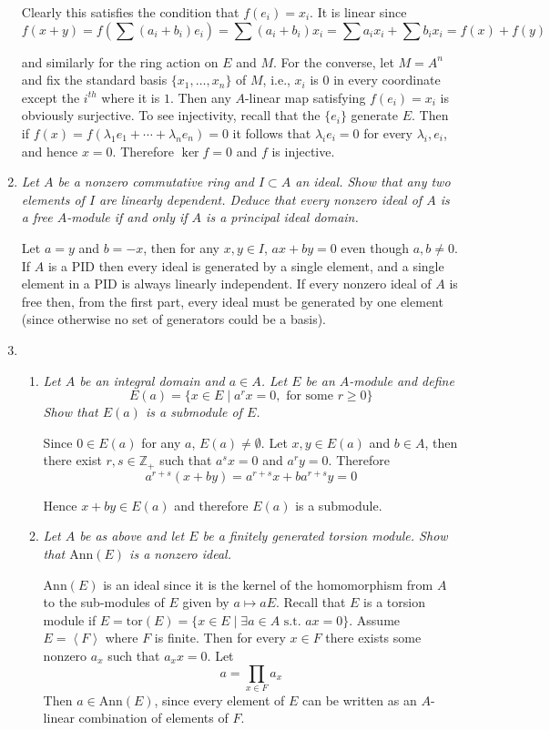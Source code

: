 \documentclass[10pt]{article}
\newcommand{\brac}[1]{
\left\langle #1 \right\rangle
}
\newcommand{\Ann}{\text{Ann}}
\newcommand{\tor}{\text{tor}}
\newcommand{\Z}{\mathbb{Z}}
\begin{document}
\begin{enumerate}
Clearly this satisfies the condition that $f(e_i) = x_i$.  It is linear since
\[
f(x+y) = f\left(\sum (a_i+b_i) e_i \right) = \sum (a_i +b_i) x_i = \sum a_i x_i  + \sum b_i x_i = f(x) + f(y)
\]

and similarly for the ring action on $E$ and $M$.  For the converse, let $M = A^n$ and fix the standard basis $\{x_1, \ldots, x_n\}$ of $M$, i.e., $x_i$ is $0$ in every coordinate except the $i^{th}$ where it is $1$.  Then any $A$-linear map satisfying $f(e_i) = x_i$ is obviously surjective.  To see injectivity, recall that the $\{e_i\}$ generate $E$.  Then if $f(x) = f(\lambda_1e_1 + \cdots + \lambda_ne_n) = 0$ it follows that $\lambda_ie_i = 0$ for every $\lambda_i, e_i$, and hence $x=0$.  Therefore $\ker f = 0$ and $f$ is injective.

\item \emph{Let $A$ be a nonzero commutative ring and $I \subset A$ an ideal.  Show that any two elements of $I$ are linearly dependent.  Deduce that every nonzero ideal of $A$ is a free $A$-module if and only if $A$ is a principal ideal domain.}

Let $a = y$ and $b = -x$, then for any $x,y \in I$, $ax + by = 0$ even though $a,b \neq 0$.  If $A$ is a PID then every ideal is generated by a single element, and a single element in a PID is always linearly independent.  If every nonzero ideal of $A$ is free then, from the first part, every ideal must be generated by one element (since otherwise no set of generators could be a basis).

\item
\begin{enumerate}
\item \emph{Let $A$ be an integral domain and $a \in A$.  Let $E$ be an $A$-module and define $$E(a) = \{x \in E \mid a^rx = 0, \mbox{ for some $r \geq 0$}\}$$  Show that $E(a)$ is a submodule of $E$.}

Since $0 \in E(a)$ for any $a$, $E(a) \neq \emptyset$.  Let $x,y \in E(a)$ and $b \in A$, then there exist $r,s \in \Z_+$ such that $a^sx = 0$ and $a^ry = 0$.  Therefore
\[
a^{r+s}(x + by) = a^{r+s}x + ba^{r+s}y = 0
\]

Hence $x+by \in E(a)$ and therefore $E(a)$ is a submodule.
\item \emph{Let $A$ be as above and let $E$ be a finitely generated torsion module.  Show that $\Ann(E)$ is a nonzero ideal.}

$\Ann(E)$ is an ideal since it is the kernel of the homomorphism from $A$ to the sub-modules of $E$ given by $a \mapsto aE$.  Recall that $E$ is a torsion module if $E = \tor(E) = \{x \in E \mid \exists a \in A \text{ s.t. } ax = 0\}$.  Assume $E = \brac{F}$ where $F$ is finite.  Then for every $x \in F$ there exists some nonzero $a_x$ such that $a_xx = 0$.  Let $$a = \prod_{x \in F} a_x$$  Then $a \in \Ann(E)$, since every element of $E$ can be written as an $A$-linear combination of elements of $F$.


\end{enumerate}
\end{enumerate}
\end{document}
